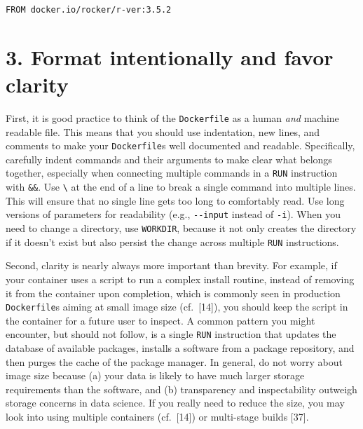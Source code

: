 \documentclass[10pt,letterpaper]{article}
\begin{document}
\begin{verbatim}
FROM docker.io/rocker/r-ver:3.5.2
\end{verbatim}

\hypertarget{format-intentionally-and-favor-clarity}{%
\section{3. Format intentionally and favor
clarity}\label{format-intentionally-and-favor-clarity}}

  \label{rule:formatting} 
  \label{rule:clarity} 

First, it is good practice to think of the \texttt{Dockerfile} as a
human \emph{and} machine readable file. This means that you should use
indentation, new lines, and comments to make your \texttt{Dockerfile}s
well documented and readable. Specifically, carefully indent commands
and their arguments to make clear what belongs together, especially when
connecting multiple commands in a \texttt{RUN} instruction with
\texttt{\&\&}. Use \texttt{\textbackslash{}} at the end of a line to
break a single command into multiple lines. This will ensure that no
single line gets too long to comfortably read. Use long versions of
parameters for readability (e.g., \texttt{-\/-input} instead of
\texttt{-i}). When you need to change a directory, use \texttt{WORKDIR},
because it not only creates the directory if it doesn't exist but also
persist the change across multiple \texttt{RUN} instructions.

Second, clarity is nearly always more important than brevity. For
example, if your container uses a script to run a complex install
routine, instead of removing it from the container upon completion,
which is commonly seen in production \texttt{Dockerfile}s aiming at
small image size (cf.~{[}14{]}), you should keep the script in the
container for a future user to inspect. A common pattern you might
encounter, but should not follow, is a single \texttt{RUN} instruction
that updates the database of available packages, installs a software
from a package repository, and then purges the cache of the package
manager. In general, do not worry about image size because (a) your data
is likely to have much larger storage requirements than the software,
and (b) transparency and inspectability outweigh storage concerns in
data science. If you really need to reduce the size, you may look into
using multiple containers (cf.~{[}14{]}) or multi-stage builds {[}37{]}.
\end{document}
